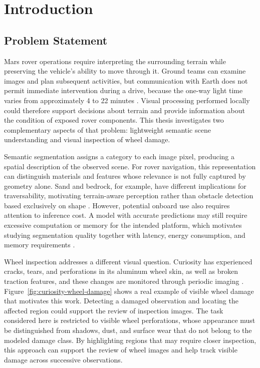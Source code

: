 \chapter{Introduction}

\section{Problem Statement}

Mars rover operations require interpreting the surrounding terrain while preserving the vehicle's ability to move through it. Ground teams can examine images and plan subsequent activities, but communication with Earth does not permit immediate intervention during a drive, because the one-way light time varies from approximately 4 to 22 minutes \cite{nasaJPL2022Driving}. Visual processing performed locally could therefore support decisions about terrain and provide information about the condition of exposed rover components. This thesis investigates two complementary aspects of that problem: lightweight semantic scene understanding and visual inspection of wheel damage.

Semantic segmentation assigns a category to each image pixel, producing a spatial description of the observed scene. For rover navigation, this representation can distinguish materials and features whose relevance is not fully captured by geometry alone. Sand and bedrock, for example, have different implications for traversability, motivating terrain-aware perception rather than obstacle detection based exclusively on shape \cite{swan2021ai4mars}. However, potential onboard use also requires attention to inference cost. A model with accurate predictions may still require excessive computation or memory for the intended platform, which motivates studying segmentation quality together with latency, energy consumption, and memory requirements \cite{xiong2024light4mars}.

Wheel inspection addresses a different visual question. Curiosity has experienced cracks, tears, and perforations in its aluminum wheel skin, as well as broken traction features, and these changes are monitored through periodic imaging \cite{rankin2022wheelassessment}. Figure~\ref{fig:curiosity-wheel-damage} shows a real example of visible wheel damage that motivates this work. Detecting a damaged observation and locating the affected region could support the review of inspection images. The task considered here is restricted to visible wheel perforations, whose appearance must be distinguished from shadows, dust, and surface wear that do not belong to the modeled damage class. By highlighting regions that may require closer inspection, this approach can support the review of wheel images and help track visible damage across successive observations.

